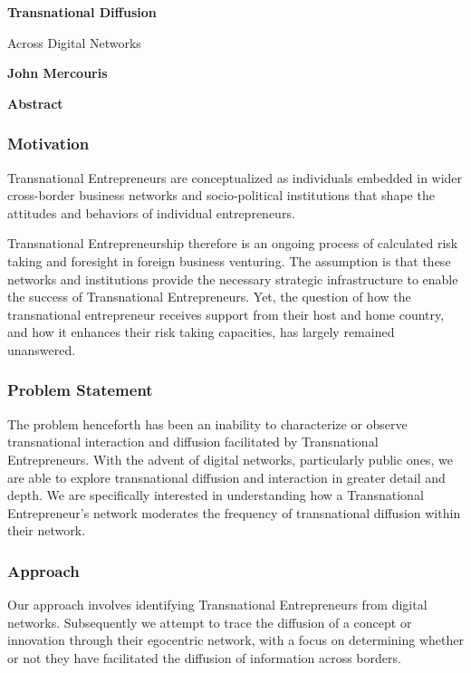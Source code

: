 \thispagestyle{plain}
\begin{center}
    \Large
    \textbf{Transnational Diffusion}
    
    \vspace{0.4cm}
    \large
    Across Digital Networks
    
    \vspace{0.4cm}
    \textbf{John Mercouris}
    
    \vspace{0.9cm}
    \textbf{Abstract}
\end{center}

\subsubsection{Motivation}
Transnational Entrepreneurs are conceptualized as individuals embedded
in wider cross-border business networks and socio-political
institutions that shape the attitudes and behaviors of individual
entrepreneurs.

Transnational Entrepreneurship therefore is an ongoing process of
calculated risk taking and foresight in foreign business
venturing. The assumption is that these networks and institutions
provide the necessary strategic infrastructure to enable the success
of Transnational Entrepreneurs. Yet, the question of how the
transnational entrepreneur receives support from their host and home
country, and how it enhances their risk taking capacities, has
largely remained unanswered.

\subsubsection{Problem Statement}
The problem henceforth has been an inability to characterize or
observe transnational interaction and diffusion facilitated by
Transnational Entrepreneurs. With the advent of digital networks,
particularly public ones, we are able to explore transnational
diffusion and interaction in greater detail and depth. We are
specifically interested in understanding how a Transnational
Entrepreneur's network moderates the frequency of transnational
diffusion within their network.

\subsubsection{Approach}
Our approach involves identifying Transnational Entrepreneurs from
digital networks. Subsequently we attempt to trace the diffusion of a
concept or innovation through their egocentric network, with a focus
on determining whether or not they have facilitated the diffusion of
information across borders.

